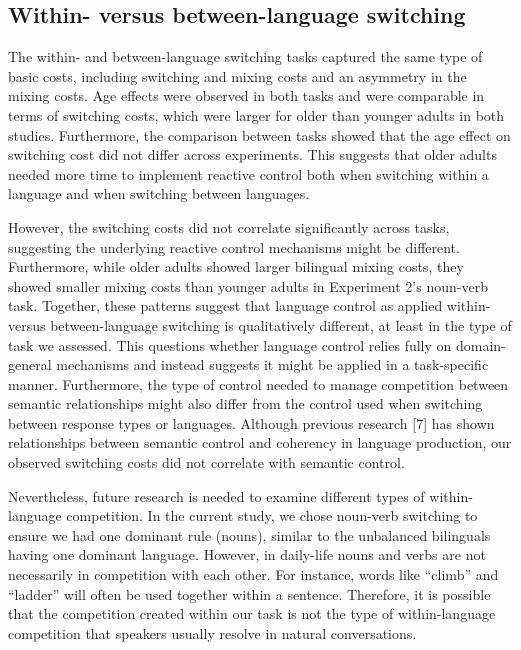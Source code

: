 \documentclass[
]{article}
\begin{document}
\hypertarget{within--versus-between-language-switching}{%
\subsection{Within- versus between-language switching}\label{within--versus-between-language-switching}}

The within- and between-language switching tasks captured the same type of basic costs, including switching and mixing costs and an asymmetry in the mixing costs. Age effects were observed in both tasks and were comparable in terms of switching costs, which were larger for older than younger adults in both studies. Furthermore, the comparison between tasks showed that the age effect on switching cost did not differ across experiments. This suggests that older adults needed more time to implement reactive control both when switching within a language and when switching between languages.

However, the switching costs did not correlate significantly across tasks, suggesting the underlying reactive control mechanisms might be different. Furthermore, while older adults showed larger bilingual mixing costs, they showed smaller mixing costs than younger adults in Experiment 2's noun-verb task. Together, these patterns suggest that language control as applied within- versus between-language switching is qualitatively different, at least in the type of task we assessed. This questions whether language control relies fully on domain-general mechanisms and instead suggests it might be applied in a task-specific manner. Furthermore, the type of control needed to manage competition between semantic relationships might also differ from the control used when switching between response types or languages. Although previous research {[}7{]} has shown relationships between semantic control and coherency in language production, our observed switching costs did not correlate with semantic control.

Nevertheless, future research is needed to examine different types of within-language competition. In the current study, we chose noun-verb switching to ensure we had one dominant rule (nouns), similar to the unbalanced bilinguals having one dominant language. However, in daily-life nouns and verbs are not necessarily in competition with each other. For instance, words like ``climb'' and ``ladder'' will often be used together within a sentence. Therefore, it is possible that the competition created within our task is not the type of within-language competition that speakers usually resolve in natural conversations.
\end{document}
